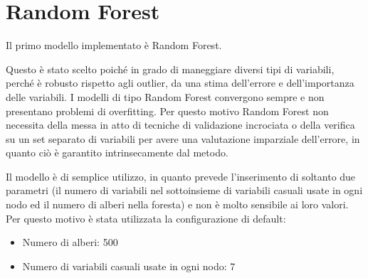 \section{Random Forest}
Il primo modello implementato è Random Forest.

Questo è stato scelto poiché in grado di maneggiare diversi tipi di variabili, 
perché è robusto rispetto agli outlier, da una stima dell'errore e 
dell'importanza delle variabili. 
I modelli di tipo Random Forest convergono sempre e non presentano problemi di 
overfitting. Per questo motivo Random Forest non necessita della messa in atto 
di tecniche di validazione incrociata o della verifica su un set separato di 
variabili per avere una valutazione imparziale dell'errore, in quanto ciò è 
garantito intrinsecamente dal metodo.

Il modello è di semplice utilizzo, in quanto prevede l’inserimento di soltanto 
due parametri (il numero di variabili nel sottoinsieme di variabili casuali 
usate in ogni nodo ed il numero di alberi nella foresta) e non è molto 
sensibile ai loro valori. Per questo motivo è stata utilizzata la 
configurazione di default: 
\begin{itemize}
	\item Numero di alberi: 500 
	\item Numero di variabili casuali usate in ogni nodo: 7
\end{itemize}
